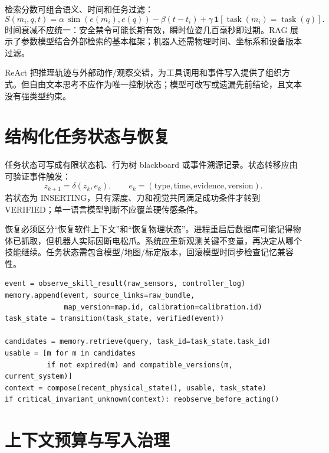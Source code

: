 检索分数可组合语义、时间和任务过滤：
\begin{equation}
S(m_i,q,t)=\alpha\,\operatorname{sim}(e(m_i),e(q))
-\beta(t-t_i)+\gamma\,\mathbf 1[\operatorname{task}(m_i)=\operatorname{task}(q)].
\label{eq:memory-retrieval-score}
\end{equation}
时间衰减不应统一：安全禁令可能长期有效，瞬时位姿几百毫秒即过期。RAG 展示了参数模型结合外部检索的基本框架\cite{lewis2020rag}；机器人还需物理时间、坐标系和设备版本过滤。

ReAct 把推理轨迹与外部动作/观察交错\cite{yao2023react}，为工具调用和事件写入提供了组织方式。但自由文本思考不应作为唯一控制状态；模型可改写或遗漏先前结论，且文本没有强类型约束。

\section{结构化任务状态与恢复}

任务状态可写成有限状态机、行为树 blackboard 或事件溯源记录。状态转移应由可验证事件触发：
\begin{equation}
z_{k+1}=\delta(z_k,e_k),\qquad
e_k=(\text{type},\text{time},\text{evidence},\text{version}).
\end{equation}
若状态为 INSERTING，只有深度、力和视觉共同满足成功条件才转到 VERIFIED；单一语言模型判断不应覆盖硬传感条件。

恢复必须区分“恢复软件上下文”和“恢复物理状态”。进程重启后数据库可能记得物体已抓取，但机器人实际因断电松爪。系统应重新观测关键不变量，再决定从哪个技能继续。任务状态需包含模型/地图/标定版本，回滚模型时同步检查记忆兼容性。

\begin{lstlisting}[caption={带版本、来源与过期检查的记忆读写教学伪代码}]
event = observe_skill_result(raw_sensors, controller_log)
memory.append(event, source_links=raw_bundle,
              map_version=map.id, calibration=calibration.id)
task_state = transition(task_state, verified(event))

candidates = memory.retrieve(query, task_id=task_state.task_id)
usable = [m for m in candidates
          if not expired(m) and compatible_versions(m, current_system)]
context = compose(recent_physical_state(), usable, task_state)
if critical_invariant_unknown(context): reobserve_before_acting()
\end{lstlisting}

\section{上下文预算与写入治理}

